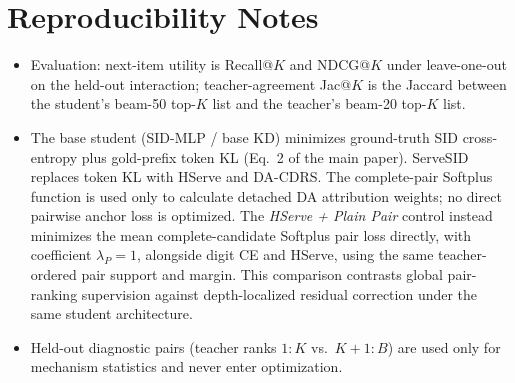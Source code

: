 \documentclass[sigconf, anonymous, review]{acmart}
\begin{document}
\section{Reproducibility Notes}
\label{sec:sup-repro}

\begin{itemize}
\item Evaluation: next-item utility is Recall@$K$ and NDCG@$K$ under
leave-one-out on the held-out interaction; teacher-agreement Jac@$K$
is the Jaccard between the student's beam-50 top-$K$ list and the
teacher's beam-20 top-$K$ list.
\item The base student (SID-MLP / base KD) minimizes ground-truth SID
cross-entropy plus gold-prefix token KL (Eq.~2 of the main paper).
ServeSID replaces token KL with HServe and DA-CDRS. The
complete-pair Softplus function is used only to calculate detached
DA attribution weights; no direct pairwise anchor loss is optimized.
The \emph{HServe + Plain Pair} control instead minimizes
the mean complete-candidate Softplus pair loss directly, with
coefficient $\lambda_P=1$, alongside digit CE and HServe,
using the same teacher-ordered pair support and margin.
This comparison contrasts global pair-ranking supervision
against depth-localized residual correction under the
same student architecture.
\item Held-out diagnostic pairs (teacher ranks $1{:}K$ vs.\
$K{+}1{:}B$) are used only for mechanism statistics and never enter
optimization.
\end{itemize}
\end{document}
